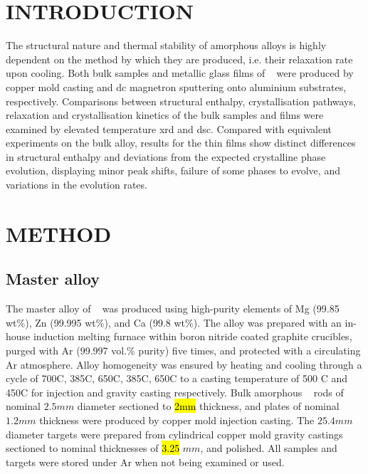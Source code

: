 \documentclass[a4paper,12pt,oneside]{article}%
\begin{document}
\newpage
{}
\tableofcontents\newpage
\clearpage %


\section{INTRODUCTION}
\glsresetall

The structural nature and thermal stability of amorphous alloys is highly dependent on the method by which they are produced, i.e. their relaxation rate upon cooling.  Both bulk samples and metallic glass films of \MgZnCa~ were produced by copper mold casting and \gls{dc} magnetron sputtering onto aluminium substrates, respectively. Comparisons between structural enthalpy, crystallisation pathways, relaxation and crystallisation kinetics of the bulk samples and films were examined by elevated temperature \acrshort{xrd} and \acrshort{dsc}. Compared with equivalent experiments on the bulk alloy, results for the thin films show distinct differences in structural enthalpy and deviations from the expected crystalline phase evolution, displaying minor peak shifts, failure of some phases to evolve, and variations in the evolution rates. 


\section{METHOD}

\subsection{Master alloy}
The master alloy of \MgZnCa~ was produced using high-purity elements of Mg (99.85 wt\%), Zn (99.995 wt\%), and Ca (99.8 wt\%). The alloy was prepared with an in-house induction melting furnace within boron nitride coated graphite crucibles, purged with Ar (99.997 vol.\% purity) five times, and protected with a circulating Ar atmosphere. Alloy homogeneity was ensured by heating and cooling through a cycle of 700\degree C, 385\degree C, 650\degree C, 385\degree C, 650\degree C to a casting temperature of 500 \degree C and 450\degree C for injection and gravity casting respectively. Bulk amorphous \MgZnCa~ rods of nominal $2.5 mm$ diameter sectioned to \hl{2mm} thickness, and plates of nominal $1.2 mm$ thickness were produced by copper mold injection casting. The $25.4 mm$ diameter targets were prepared from cylindrical copper mold gravity castings sectioned to nominal thicknesses of \hl{3.25} $mm$, and polished. All samples and targets were stored under Ar when not being examined or used. 
\end{document}
